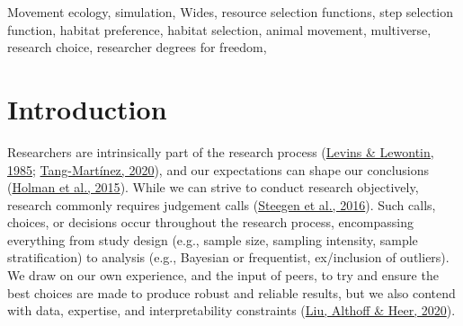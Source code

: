 \documentclass[10pt,a4paper]{article}
\begin{document}
Movement ecology, simulation, Wides, resource selection functions, step selection function, habitat preference, habitat selection, animal movement, multiverse, research choice, researcher degrees for freedom,

\clearpage
\pagestyle{fancy}

\hypertarget{introduction}{%
\section{Introduction}\label{introduction}}

Researchers are intrinsically part of the research process (\protect\hyperlink{ref-levins_dialectical_1985}{Levins \& Lewontin, 1985}; \protect\hyperlink{ref-tang-martinez_history_2020}{Tang-Martínez, 2020}), and our expectations can shape our conclusions (\protect\hyperlink{ref-holman_evidence_2015}{Holman et al., 2015}).
While we can strive to conduct research objectively, research commonly requires judgement calls (\protect\hyperlink{ref-steegen_increasing_2016}{Steegen et al., 2016}).
Such calls, choices, or decisions occur throughout the research process, encompassing everything from study design (e.g., sample size, sampling intensity, sample stratification) to analysis (e.g., Bayesian or frequentist, ex/inclusion of outliers).
We draw on our own experience, and the input of peers, to try and ensure the best choices are made to produce robust and reliable results, but we also contend with data, expertise, and interpretability constraints (\protect\hyperlink{ref-liu_paths_2020}{Liu, Althoff \& Heer, 2020}).
\end{document}
